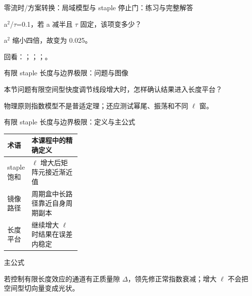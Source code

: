 \begin{frame}[t]{零流时/\allowbreak{}方案转换：局域模型与 staple 停止门：练习与完整解答}
\footnotesize
\begin{block}{}a\ensuremath{^{2}}/\allowbreak{}\ensuremath{\tau}=0.1，若 a 减半且 \ensuremath{\tau} 固定，该项变多少？\end{block}
\begin{exampleblock}{}a\ensuremath{^{2}} 缩小四倍，故变为 0.025。\end{exampleblock}
\vfill
\scriptsize 回看：；；；。
\end{frame}

\begin{frame}[t]{有限 staple 长度与边界极限：问题与图像}
\footnotesize
\begin{block}{本节问题}有限空间型快度调节线段增大时，怎样确认结果进入长度平台？\end{block}
\begin{block}{物理原则}\quad 指数模型不是普适定理；还应测试幂尾、振荡和不同 \ensuremath{\ell} 窗。\end{block}
\end{frame}

\begin{frame}[t]{有限 staple 长度与边界极限：定义与主公式}
\footnotesize\begin{tabularx}{\linewidth}{p{0.30\linewidth}Y}
\toprule 术语 & 本课程中的精确定义\\\midrule
{} staple 饱和 & \ensuremath{\ell} 增大后矩阵元接近渐近值\\
 镜像路径 & 周期盒中长路径靠近自身周期副本\\
 长度平台 & 继续增大 \ensuremath{\ell} 时结果在误差内稳定\\
\bottomrule\end{tabularx}\vspace{0.15cm}
\begin{block}{ 主公式}\centering{}\end{block}
若控制有限长度效应的通道有正质量隙 \ensuremath{\Delta}，领先修正常指数衰减；增大 \ensuremath{\ell} 不会把空间型切向量变成光状。
\end{frame}

